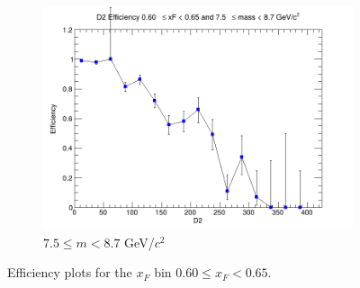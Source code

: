 \begin{figure}[p]
\begin{subfigure}[b]{0.32\textwidth}
        \includegraphics[width=\textwidth]{./kTrackerEfficiencyPlots/D2_Efficiency_xF12_mass10.png}
        \caption{$7.5 \leq m < 8.7$ GeV/$c^2$}
        \label{fig:xF12_mass10}
    \end{subfigure}
    \hfill
    \caption{Efficiency plots for the $x_F$ bin $0.60 \leq x_F < 0.65$.}
    \label{fig:xF12}
\end{figure}

\clearpage

